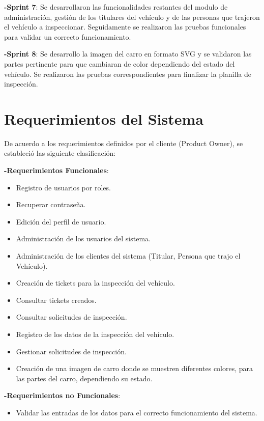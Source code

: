 \textbf{-Sprint 7}: Se desarrollaron las funcionalidades restantes del modulo de administración, gestión de los titulares del vehículo y de las personas que trajeron el vehículo a inspeccionar. Seguidamente se realizaron las pruebas funcionales para validar un correcto funcionamiento.

\textbf{-Sprint 8}: Se desarrollo la imagen del carro en formato SVG y se validaron las partes pertinente para que cambiaran de color dependiendo del estado del vehículo. Se realizaron las pruebas correspondientes para finalizar la planilla de inspección.

\setlength{\parskip}{0mm}


\section{Requerimientos del Sistema } 
\setlength{\parskip}{5mm}
	De acuerdo a los requerimientos definidos por el cliente (Product Owner), se estableció las siguiente clasificación:

	\textbf{-Requerimientos Funcionales}: 

	\begin{itemize}
		\item Registro de usuarios por roles.
		\item Recuperar contraseña.
		\item Edición del perfil de usuario.
		\item Administración de los usuarios del sistema.
		\item Administración de los clientes del sistema (Titular, Persona que trajo el Vehículo).
		\item Creación de tickets para la inspección del vehículo.
		\item Consultar tickets creados.
		\item Consultar solicitudes de inspección.
		\item Registro de los datos de la inspección del vehículo.
		\item Gestionar solicitudes de inspección.
		\item Creación de una imagen de carro donde se muestren diferentes colores, para las partes del carro, dependiendo su estado.
	\end{itemize}

	\textbf{-Requerimientos no Funcionales}: 

	\begin{itemize}
		\item Validar las entradas de los datos para el correcto funcionamiento del sistema.
	\end{itemize}

